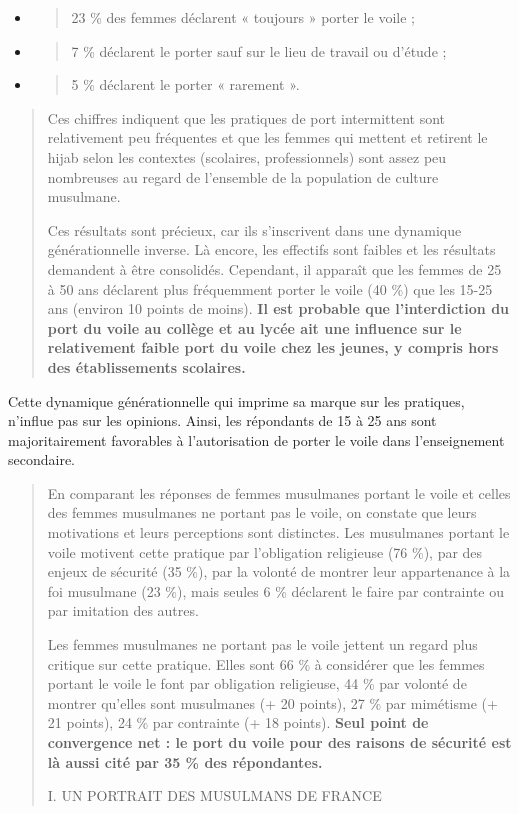 \begin{itemize}
\item
  \begin{quote}
  23 \% des femmes déclarent « toujours » porter le voile ;
  \end{quote}
\item
  \begin{quote}
  7 \% déclarent le porter sauf sur le lieu de travail ou d'étude ;
  \end{quote}
\item
  \begin{quote}
  5 \% déclarent le porter « rarement ».
  \end{quote}
\end{itemize}

\begin{quote}
Ces chiffres indiquent que les pratiques de port intermittent sont
relativement peu fréquentes et que les femmes qui mettent et retirent le
hijab selon les contextes (scolaires, professionnels) sont assez peu
nombreuses au regard de l'ensemble de la population de culture
musulmane.

Ces résultats sont précieux, car ils s'inscrivent dans une dynamique
générationnelle inverse. Là encore, les effectifs sont faibles et les
résultats demandent à être consolidés. Cependant, il apparaît que les
femmes de 25 à 50 ans déclarent plus fréquemment porter le voile (40 \%)
que les 15-25 ans (environ 10 points de moins). \textbf{Il est probable
que l'interdiction du port du voile au collège et au lycée ait une
influence sur le relativement faible port du voile chez les jeunes, y
compris hors des établissements scolaires.}
\end{quote}

Cette dynamique générationnelle qui imprime sa marque sur les pratiques,
n'influe pas sur les opinions. Ainsi, les répondants de 15 à 25 ans sont
majoritairement favorables à l'autorisation de porter le voile dans
l'enseignement secondaire.

\begin{quote}
En comparant les réponses de femmes musulmanes portant le voile et
celles des femmes musulmanes ne portant pas le voile, on constate que
leurs motivations et leurs perceptions sont distinctes. Les musulmanes
portant le voile motivent cette pratique par l'obligation religieuse (76
\%), par des enjeux de sécurité (35 \%), par la volonté de montrer leur
appartenance à la foi musulmane (23 \%), mais seules 6 \% déclarent le
faire par contrainte ou par imitation des autres.

Les femmes musulmanes ne portant pas le voile jettent un regard plus
critique sur cette pratique. Elles sont 66 \% à considérer que les
femmes portant le voile le font par obligation religieuse, 44 \% par
volonté de montrer qu'elles sont musulmanes (+ 20 points), 27 \% par
mimétisme (+ 21 points), 24 \% par contrainte (+ 18 points).
\textbf{Seul point de convergence net : le port du voile pour des
raisons de sécurité est là aussi cité par 35 \% des répondantes.}

I. UN PORTRAIT DES MUSULMANS DE FRANCE
\end{quote}

